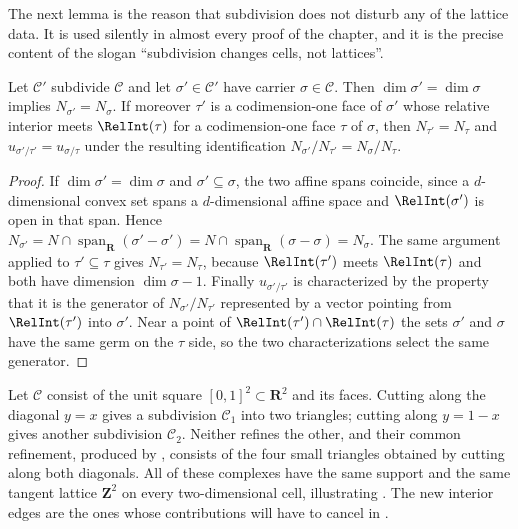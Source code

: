The next lemma is the reason that subdivision does not disturb any of the
lattice data.  It is used silently in almost every proof of the chapter, and
it is the precise content of the slogan ``subdivision changes cells, not
lattices''.

\begin{lemma}
\label{lem:ch10-subdivision-lattices}
Let $\mathscr C'$ subdivide $\mathscr C$ and let $\sigma'\in\mathscr C'$ have
carrier $\sigma\in\mathscr C$.  Then
$\dim\sigma'=\dim\sigma$ implies $N_{\sigma'}=N_\sigma$.  If moreover $\tau'$
is a codimension-one face of $\sigma'$ whose relative interior meets
$\RelInt(\tau)$ for a codimension-one face $\tau$ of $\sigma$, then
$N_{\tau'}=N_\tau$ and $u_{\sigma'/\tau'}=u_{\sigma/\tau}$ under the
resulting identification $N_{\sigma'}/N_{\tau'}=N_\sigma/N_\tau$.
\end{lemma}

\begin{proof}
If $\dim\sigma'=\dim\sigma$ and $\sigma'\subseteq\sigma$, the two affine
spans coincide, since a $d$-dimensional convex set spans a $d$-dimensional
affine space and $\RelInt(\sigma')$ is open in that span.  Hence
$N_{\sigma'}=N\cap\operatorname{span}_{\mathbf R}(\sigma'-\sigma')
=N\cap\operatorname{span}_{\mathbf R}(\sigma-\sigma)=N_\sigma$.  The same
argument applied to $\tau'\subseteq\tau$ gives $N_{\tau'}=N_\tau$, because
$\RelInt(\tau')$ meets $\RelInt(\tau)$ and both have dimension
$\dim\sigma-1$.  Finally $u_{\sigma'/\tau'}$ is characterized by the property
that it is the generator of $N_{\sigma'}/N_{\tau'}$ represented by a vector
pointing from $\RelInt(\tau')$ into $\sigma'$.  Near a point of
$\RelInt(\tau')\cap\RelInt(\tau)$ the sets $\sigma'$ and $\sigma$ have the
same germ on the $\tau$ side, so the two characterizations select the same
generator.
\end{proof}

\begin{example}
\label{ex:ch10-incomparable}
Let $\mathscr C$ consist of the unit square $[0,1]^2\subset\mathbf R^2$ and
its faces.  Cutting along the diagonal $y=x$ gives a subdivision
$\mathscr C_1$ into two triangles; cutting along $y=1-x$ gives another
subdivision $\mathscr C_2$.  Neither refines the other, and their common
refinement, produced by , consists of
the four small triangles obtained by cutting along both diagonals.  All of
these complexes have the same support and the same tangent lattice
$\mathbf Z^2$ on every two-dimensional cell, illustrating
.  The new interior edges are the ones
whose contributions will have to cancel in
.
\end{example}

